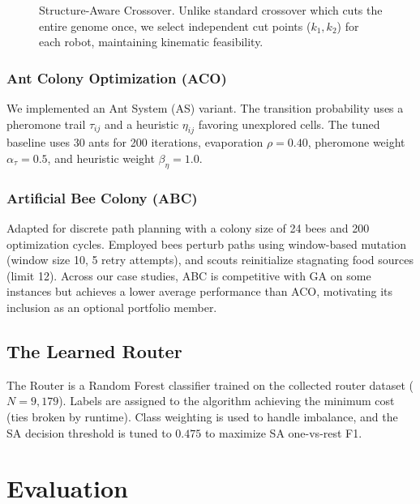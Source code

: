 \documentclass[conference]{IEEEtran}
\begin{document}
\begin{figure}[!htb]
\caption{Structure-Aware Crossover. Unlike standard crossover which cuts the entire genome once, we select independent cut points ($k_1, k_2$) for each robot, maintaining kinematic feasibility.}
\label{fig:crossover}
\end{figure}

\subsubsection{Ant Colony Optimization (ACO)}
We implemented an Ant System (AS) variant. The transition probability uses a pheromone trail $\tau_{ij}$ and a heuristic $\eta_{ij}$ favoring unexplored cells. The tuned baseline uses 30 ants for 200 iterations, evaporation $\rho=0.40$, pheromone weight $\alpha_{\tau}=0.5$, and heuristic weight $\beta_{\eta}=1.0$.

\subsubsection{Artificial Bee Colony (ABC)}
Adapted for discrete path planning with a colony size of 24 bees and 200 optimization cycles. Employed bees perturb paths using window-based mutation (window size 10, 5 retry attempts), and scouts reinitialize stagnating food sources (limit 12). Across our case studies, ABC is competitive with GA on some instances but achieves a lower average performance than ACO, motivating its inclusion as an optional portfolio member.

\FloatBarrier

\subsection{The Learned Router}
The Router is a Random Forest classifier trained on the collected router dataset ($N=9{,}179$). Labels are assigned to the algorithm achieving the minimum cost (ties broken by runtime). Class weighting is used to handle imbalance, and the SA decision threshold is tuned to $0.475$ to maximize SA one-vs-rest F1.

\section{Evaluation}
\label{sec:evaluation}
\end{document}
